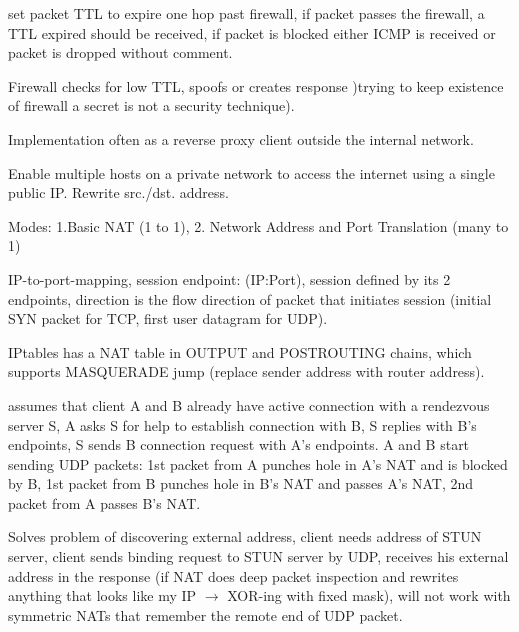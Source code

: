  set packet TTL to expire one hop past firewall, if packet passes the firewall, a TTL expired should be received, if packet is blocked either ICMP is received or packet is dropped without comment.

 Firewall checks for low TTL, spoofs or creates response )trying to keep existence of firewall a secret is not a security technique).

Implementation often as a reverse proxy client outside the internal network.

 Enable multiple hosts on a private network to access the internet using a single public IP. Rewrite src./dst. address. 

Modes: 1.Basic NAT (1 to 1), 2. Network Address and Port Translation (many to 1)

 IP-to-port-mapping, session endpoint: (IP:Port), session defined by its 2 endpoints, direction is the flow direction of packet that initiates session (initial SYN packet for TCP, first user datagram for UDP).

 IPtables has a NAT table in OUTPUT and POSTROUTING chains, which supports MASQUERADE jump (replace sender address with router address).

 assumes that client A and B already have active connection with a rendezvous server S, A asks S for help to establish connection with B, S replies with B's endpoints, S sends B connection request with A's endpoints. A and B start sending UDP packets: 1st packet from A punches hole in A's NAT and is blocked by B, 1st packet from B punches hole in B's NAT and passes A's NAT, 2nd packet from A passes B's NAT.

 Solves problem of discovering external address, client needs address of STUN server, client sends binding request to STUN server by UDP, receives his external address in the response (if NAT does deep packet inspection and rewrites anything that looks like my IP $\to$ XOR-ing with fixed mask), will not work with symmetric NATs that remember the remote end of UDP packet.

